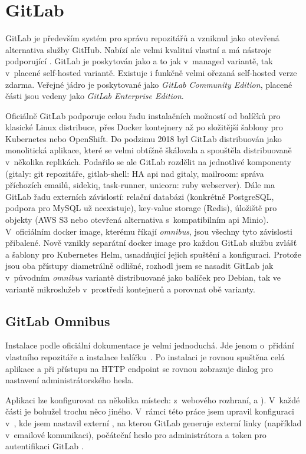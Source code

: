 \section{GitLab}
    \label{sec:gitlab}
    GitLab je především systém pro správu repozitářů a vzniknul jako otevřená alternativa služby GitHub. Nabízí ale velmi kvalitní vlastní \CI a má nástroje podporující \CD. GitLab je poskytován jako  a to jak v~managed variantě, tak v~placené self-hosted variantě. Existuje i funkčně velmi ořezaná self-hosted verze zdarma. Veřejné jádro je poskytované jako \textit{GitLab Community Edition}, placené části jsou vedeny jako \textit{GitLab Enterprise Edition}.

    Oficiálně GitLab podporuje celou řadu instalačních možností od balíčků pro klasické Linux distribuce, přes Docker kontejnery až po složitější šablony pro Kubernetes nebo OpenShift. Do podzimu 2018 byl GitLab distribuován jako monolitická aplikace, které se velmi obtížně škálovala a spouštěla distribuovaně v~několika replikách. Podařilo se ale GitLab rozdělit na jednotlivé komponenty (gitaly: git repozitáře, gitlab-shell: HA api nad gitaly, mailroom: správa příchozích emailů, sidekiq, task-runner, unicorn: ruby webserver). Dále ma GitLab řadu externích závislostí: relační databázi (konkrétně PostgreSQL, podpora pro MySQL už neexistuje), key-value storage (Redis), úložiště pro objekty (AWS S3 nebo otevřená alternativa s~kompatibilním api Minio). V~oficiálním docker image, kterému říkají \textit{omnibus}, jsou všechny tyto závislosti přibalené. Nově vznikly separátní docker image pro každou GitLab službu zvlášť a šablony pro Kubernetes Helm, usnadňující jejich spuštění a konfiguraci. Protože jsou oba přístupy diametrálně odlišné, rozhodl jsem se nasadit GitLab jak v~původním \textit{omnibus} variantě distribuované jako balíček pro Debian, tak ve variantě mikroslužeb v~prostředí kontejnerů a porovnat obě varianty.

    \subsection{GitLab Omnibus}
        Instalace podle oficiální dokumentace je velmi jednoduchá. Jde jenom o~přidání vlastního repozitáře a instalace balíčku~\cite{gitlab-install-ubuntu}. Po instalaci je rovnou spuštěna celá aplikace a při přístupu na HTTP endpoint se rovnou zobrazuje dialog pro nastavení administrátorského hesla.

        Aplikaci lze konfigurovat na několika místech: z~webového rozhraní,  a ). V~každé části je bohužel trochu něco jiného. V~rámci této práce jsem upravil konfiguraci v~, kde jsem nastavil externí , na kterou GitLab generuje externí linky (například v~emailové komunikaci), počáteční heslo pro administrátora a token pro autentifikaci GitLab \CI.

